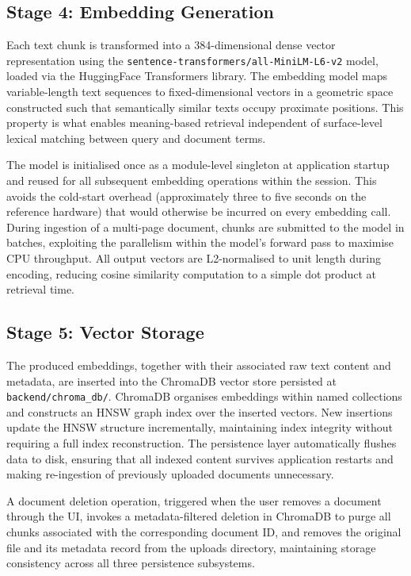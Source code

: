 \subsection{Stage 4: Embedding Generation}

Each text chunk is transformed into a 384-dimensional dense vector representation using the \texttt{sentence-transformers/all-MiniLM-L6-v2} model, loaded via the HuggingFace Transformers library. The embedding model maps variable-length text sequences to fixed-dimensional vectors in a geometric space constructed such that semantically similar texts occupy proximate positions. This property is what enables meaning-based retrieval independent of surface-level lexical matching between query and document terms.

The model is initialised once as a module-level singleton at application startup and reused for all subsequent embedding operations within the session. This avoids the cold-start overhead (approximately three to five seconds on the reference hardware) that would otherwise be incurred on every embedding call. During ingestion of a multi-page document, chunks are submitted to the model in batches, exploiting the parallelism within the model's forward pass to maximise CPU throughput. All output vectors are L2-normalised to unit length during encoding, reducing cosine similarity computation to a simple dot product at retrieval time.

\subsection{Stage 5: Vector Storage}

The produced embeddings, together with their associated raw text content and metadata, are inserted into the ChromaDB vector store persisted at \texttt{backend/chroma\_db/}. ChromaDB organises embeddings within named collections and constructs an HNSW graph index over the inserted vectors. New insertions update the HNSW structure incrementally, maintaining index integrity without requiring a full index reconstruction. The persistence layer automatically flushes data to disk, ensuring that all indexed content survives application restarts and making re-ingestion of previously uploaded documents unnecessary.

A document deletion operation, triggered when the user removes a document through the UI, invokes a metadata-filtered deletion in ChromaDB to purge all chunks associated with the corresponding document ID, and removes the original file and its metadata record from the uploads directory, maintaining storage consistency across all three persistence subsystems.

